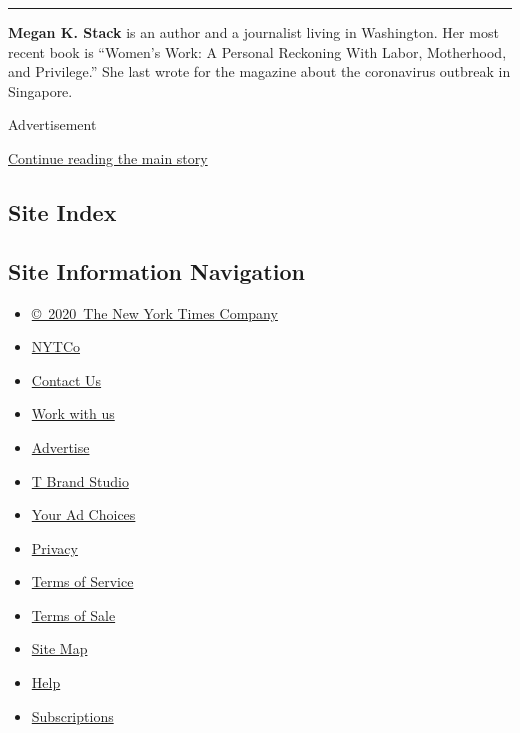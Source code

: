 \begin{center}\rule{0.5\linewidth}{\linethickness}\end{center}

\textbf{Megan K. Stack} is an author and a journalist living in
Washington. Her most recent book is ``Women's Work: A Personal Reckoning
With Labor, Motherhood, and Privilege.'' She last wrote for the magazine
about the coronavirus outbreak in Singapore.

Advertisement

\protect\hyperlink{after-bottom}{Continue reading the main story}

\hypertarget{site-index}{%
\subsection{Site Index}\label{site-index}}

\hypertarget{site-information-navigation}{%
\subsection{Site Information
Navigation}\label{site-information-navigation}}

\begin{itemize}
\tightlist
\item
  \href{https://help.nytimes.com/hc/en-us/articles/115014792127-Copyright-notice}{©~2020~The
  New York Times Company}
\end{itemize}

\begin{itemize}
\tightlist
\item
  \href{https://www.nytco.com/}{NYTCo}
\item
  \href{https://help.nytimes.com/hc/en-us/articles/115015385887-Contact-Us}{Contact
  Us}
\item
  \href{https://www.nytco.com/careers/}{Work with us}
\item
  \href{https://nytmediakit.com/}{Advertise}
\item
  \href{http://www.tbrandstudio.com/}{T Brand Studio}
\item
  \href{https://www.nytimes.com/privacy/cookie-policy\#how-do-i-manage-trackers}{Your
  Ad Choices}
\item
  \href{https://www.nytimes.com/privacy}{Privacy}
\item
  \href{https://help.nytimes.com/hc/en-us/articles/115014893428-Terms-of-service}{Terms
  of Service}
\item
  \href{https://help.nytimes.com/hc/en-us/articles/115014893968-Terms-of-sale}{Terms
  of Sale}
\item
  \href{https://spiderbites.nytimes.com}{Site Map}
\item
  \href{https://help.nytimes.com/hc/en-us}{Help}
\item
  \href{https://www.nytimes.com/subscription?campaignId=37WXW}{Subscriptions}
\end{itemize}
